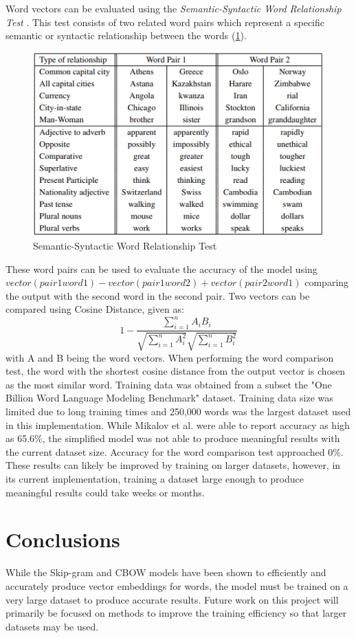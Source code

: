 \documentclass{article}
\begin{document}
Word vectors can be evaluated using the \emph{Semantic-Syntactic Word Relationship Test} \cite{efficient}. This test consists of two related word pairs which represent a specific semantic or syntactic relationship between the words  (\ref{fig:test}). 
\begin{figure}
	\includegraphics[width=\linewidth]{test.png}
	\caption{Semantic-Syntactic Word Relationship Test}
	\label{fig:test}
\end{figure}
These word pairs can be used to evaluate the accuracy of the model using $vector(pair1word1) - vector(pair1word2) + vector(pair2word1)$ comparing the output with the second word in the second pair. Two vectors can be compared using Cosine Distance, given as: 
$$
1 - \frac{\sum_{i=1}^{n} A_i B_i}{\sqrt{\sum_{i=1}^{n} A_{i}^{2}}\sqrt{\sum_{i=1}^{n} B_{i}^{2}}}
$$ with A and B being the word vectors. When performing the word comparison test, the word with the shortest cosine distance from the output vector is chosen as the most similar word. Training data was obtained from a subset the "One Billion Word Language Modeling Benchmark" dataset. Training data size was limited due to long training times and 250,000 words was the largest dataset used in this implementation. While Mikalov et al. were able to report accuracy as high as 65.6\%, the simplified model was not able to produce meaningful results with the current dataset size. Accuracy for the word comparison test approached 0\%. These results can likely be improved by training on larger datasets, however, in its current implementation, training a dataset large enough to produce meaningful results could take weeks or months.
\section{Conclusions}

While the Skip-gram and CBOW models have been shown to efficiently and accurately produce vector embeddings for words, the model must be trained on a very large dataset to  produce accurate results. Future work on this project will primarily be focused on methods to improve the training efficiency so that larger datasets may be used. 



\end{document}
